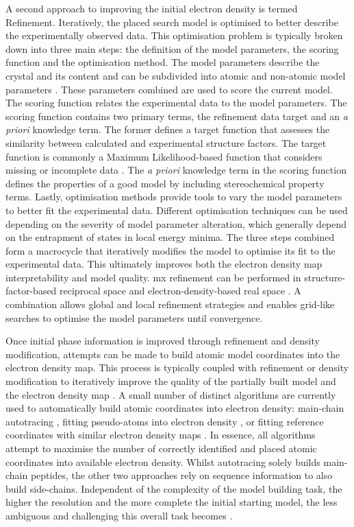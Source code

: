A second approach to improving the initial electron density is termed Refinement. Iteratively, the placed search model is optimised to better describe the experimentally observed data. This optimisation problem is typically broken down into three main steps: the definition of the model parameters, the scoring function and the optimisation method. The model parameters describe the crystal and its content and can be subdivided into atomic and non-atomic model parameters \cite{Afonine2012-bg}. These parameters combined are used to score the current model. The scoring function relates the experimental data to the model parameters. The scoring function contains two primary terms, the refinement data target and an \textit{a priori} knowledge term. The former defines a target function that assesses the similarity between calculated and experimental structure factors. The target function is commonly a Maximum Likelihood-based function that considers missing or incomplete data \cite{Murshudov2011-ww,Afonine2012-bg}. The \textit{a priori} knowledge term in the scoring function defines the properties of a good model by including stereochemical property terms. Lastly, optimisation methods provide tools to vary the model parameters to better fit the experimental data. Different optimisation techniques can be used depending on the severity of model parameter alteration, which generally depend on the entrapment of states in local energy minima. The three steps combined form a macrocycle that iteratively modifies the model to optimise its fit to the experimental data. This ultimately improves both the electron density map interpretability and model quality. \gls{mx} refinement can be performed in structure-factor-based reciprocal space and electron-density-based real space \cite{Afonine2012-bg}. A combination allows global and local refinement strategies and enables grid-like searches to optimise the model parameters until convergence.

Once initial phase information is improved through refinement and density modification, attempts can be made to build atomic model coordinates into the electron density map. This process is typically coupled with refinement or density modification to iteratively improve the quality of the partially built model and the electron density map \cite{Rupp2010-nc}. A small number of distinct algorithms are currently used to automatically build atomic coordinates into electron density: main-chain autotracing \cite{Sheldrick2010-cx}, fitting pseudo-atoms into electron density \cite{Lamzin2001-cn}, or fitting reference coordinates with similar electron density maps \cite{Terwilliger2004-ig,Cowtan2006-xv}. In essence, all algorithms attempt to maximise the number of correctly identified and placed atomic coordinates into available electron density. Whilst autotracing solely builds main-chain peptides, the other two approaches rely on sequence information to also build side-chains. Independent of the complexity of the model building task, the higher the resolution and the more complete the initial starting model, the less ambiguous and challenging this overall task becomes \cite{Rupp2010-nc}. 

